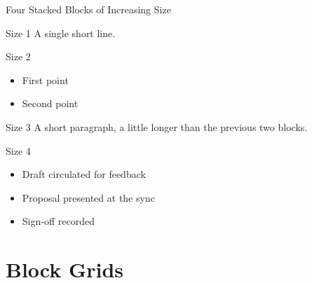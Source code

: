\documentclass[aspectratio=169]{beamer}
\begin{document}
\begin{frame}{Four Stacked Blocks of Increasing Size}
  \begin{block}{Size 1}
    {\scriptsize A single short line.}
  \end{block}
  \begin{block}{Size 2}
    {\scriptsize
      \begin{itemize}
        \item First point
        \item Second point
      \end{itemize}
    }
  \end{block}
  \begin{block}{Size 3}
    {\scriptsize A short paragraph, a little longer than the previous
    two blocks.}
  \end{block}
  \begin{block}{Size 4}
    {\scriptsize
      \begin{itemize}
        \item Draft circulated for feedback
        \item Proposal presented at the sync
        \item Sign-off recorded
      \end{itemize}
    }
  \end{block}
\end{frame}

\section{Block Grids}
\end{document}
